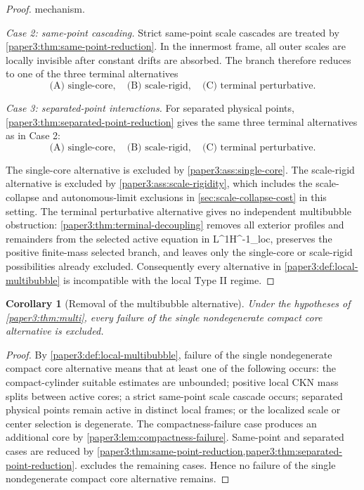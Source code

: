 \documentclass[11pt]{amsart}
\def\({}%
\def\){}%
\def\mathrm#1{#1}%
\theoremstyle{plain}
\newtheorem{corollary}[theorem]{Corollary}
\theoremstyle{definition}
\theoremstyle{remark}
\begin{document}
\begin{proof}
mechanism.
\par
\textit{Case 2: same-point cascading.}
Strict same-point scale cascades are treated by
\cref{paper3:thm:same-point-reduction}.  In the innermost frame, all outer scales are
locally invisible after constant drifts are absorbed.  The branch therefore
reduces to one of the three terminal alternatives
\[
  \text{(A) single-core},\quad \text{(B) scale-rigid},\quad \text{(C) terminal perturbative}.
\]
\par
\textit{Case 3: separated-point interactions.}
For separated physical points, \cref{paper3:thm:separated-point-reduction} gives the same
three terminal alternatives as in Case 2:
\[
  \text{(A) single-core},\quad \text{(B) scale-rigid},\quad \text{(C) terminal perturbative}.
\]

The single-core alternative is excluded by \cref{paper3:ass:single-core}.  The
scale-rigid alternative is excluded by \cref{paper3:ass:scale-rigidity}, which includes
the scale-collapse and autonomous-limit exclusions in \cref{sec:scale-collapse-cost} in this setting.  The
terminal perturbative alternative gives no independent multibubble obstruction:
\cref{paper3:thm:terminal-decoupling} removes all exterior profiles and remainders from
the selected active equation in \(L^1H^{-1}_{\mathrm{loc}}\), preserves the positive
finite-mass selected branch, and leaves only the single-core or scale-rigid
possibilities already excluded.  Consequently every alternative in
\cref{paper3:def:local-multibubble} is incompatible with the local Type II regime.
\end{proof}

\begin{corollary}[Removal of the multibubble alternative]\label{paper3:cor:multi-removal}
Under the hypotheses of \cref{paper3:thm:multi}, every failure of the single
nondegenerate compact core alternative is excluded.
\end{corollary}

\begin{proof}
By \cref{paper3:def:local-multibubble}, failure of the single nondegenerate compact
core alternative means that at least one of the following occurs: the
compact-cylinder suitable estimates are unbounded; positive local CKN mass splits
between active cores; a strict same-point scale cascade occurs; separated
physical points remain active in distinct local frames; or the localized scale
or center selection is degenerate.  The compactness-failure case produces an
additional core by \cref{paper3:lem:compactness-failure}.  Same-point and separated
cases are reduced by \cref{paper3:thm:same-point-reduction,paper3:thm:separated-point-reduction}.
 excludes the remaining cases.  Hence no failure of the
single nondegenerate compact core alternative remains.
\end{proof}
\end{document}
